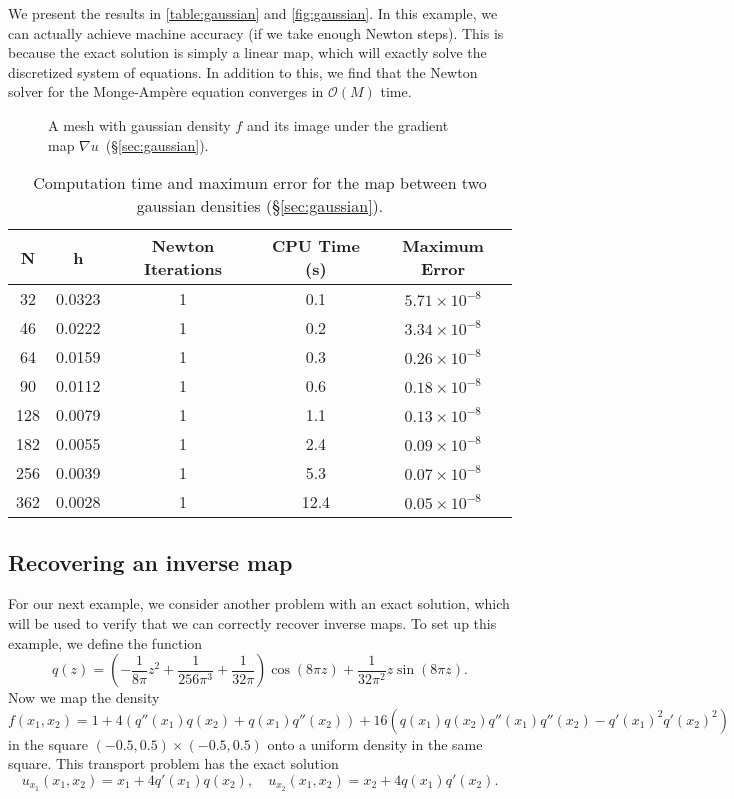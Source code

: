 \documentclass{amsart}
\theoremstyle{lemma}
\theoremstyle{remark}
\begin{document}
We present the results in \autoref{table:gaussian} and \autoref{fig:gaussian}.  
In this example, we can actually achieve machine accuracy (if we take enough Newton steps).    This is because the exact solution is simply a linear map, which will exactly solve the discretized system of equations.
In addition to this, we find that the Newton solver for the {{Monge-Amp\`ere}\xspace} equation converges in ${\mathcal{O}}(M)$ time.

\begin{figure}[htdp]
	\centering
  	\vspace*{-12pt}\caption{
  	 A mesh with gaussian density $f$ and  its image under the gradient map $\nabla 	u$~(\S\ref{sec:gaussian}). }
  	\label{fig:gaussian}
\end{figure} 

\begin{table}[htdp]\small
\begin{center}
\begin{tabular}{ccccc}
N  & h & Newton Iterations & CPU Time (s) & {Maximum Error} \\
\hline
32 & 0.0323 & 1 & 0.1 & $5.71\times10^{-8}$ \\
46 & 0.0222 & 1 & 0.2 & $3.34\times10^{-8}$ \\
64 & 0.0159 & 1 & 0.3 & $0.26\times10^{-8}$ \\
90 & 0.0112 & 1 & 0.6 & $0.18\times10^{-8}$ \\
128 & 0.0079 & 1 & 1.1 & $0.13\times10^{-8}$\\
182 & 0.0055 & 1 & 2.4 & $0.09\times10^{-8}$\\
256 & 0.0039 & 1 & 5.3 & $0.07\times10^{-8}$\\
362 & 0.0028 & 1 & 12.4 & $0.05\times10^{-8}$
\end{tabular}
\end{center}
\caption{Computation time and maximum error for the map between two gaussian densities (\S\ref{sec:gaussian}).}
\label{table:gaussian}
\end{table}

\subsection{Recovering an inverse map}\label{sec:inverse}
For our next example, we consider another problem with an exact solution, which will be used to verify that we can correctly recover inverse maps.  To set up this example, we define the function
\[ q(z) = \left(-\frac{1}{8\pi}z^2 + \frac{1}{256\pi^3}+\frac{1}{32\pi}\right)\cos(8\pi z) + \frac{1}{32\pi^2}z\sin(8\pi z). \]
Now we map the density 
\[ f(x_1,x_2) = 1+4(q''(x_1)q(x_2)+q(x_1)q''(x_2)) + 16(q(x_1)q(x_2)q''(x_1)q''(x_2)-q'(x_1)^2q'(x_2)^2) \]
in the square $(-0.5,0.5)\times(-0.5,0.5)$ onto a uniform density in the same square.  This transport problem has the exact solution
\[ u_{x_1}(x_1,x_2) = x_1 + 4q'(x_1)q(x_2),\quad u_{x_2}(x_1,x_2) = x_2 + 4q(x_1)q'(x_2). \]
\end{document}
